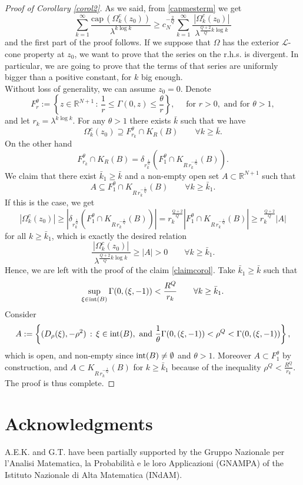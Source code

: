 \documentclass[10pt]{amsart}
\def \RNu {\mathbb{R}^{N+1}}
\def \l {\lambda}
\def\elle{\mathcal{L}}
\numberwithin{equation}{section}
\begin{document}
\begin{proof}[Proof of Corollary \ref{corol2}]
As we said, from \eqref{capmesterm} we get
$$\sum_{k=1}^{\infty}{\frac{\mathrm{cap\, } (\Omega^c_k(z_0))}{\l^{k\log{k}}}}\geq c_N^{-\frac{2}{Q}} \sum_{k=1}^{\infty}{\frac{|\Omega^c_k(z_0)|}{\,\,\l^{\frac{Q+2}{Q}k\log{k}}\,\,}}$$
and the first part of the proof follows. If we suppose that $\Omega$ has the exterior $\elle$-cone property at $z_0$, we want to prove that the series on the r.h.s. is divergent. In particular, we are going to prove that the terms of that series are uniformly bigger than a positive constant, for $k$ big enough.\\
Without loss of generality, we can assume $z_0=0$. Denote
$$F_r^{\theta}:=\left\{z\in\RNu\,:\, \frac{1}{r}\leq \Gamma(0,z)\leq\frac{\theta}{r}\right\},\quad\mbox{ for }r>0, \mbox{ and for }\theta>1,$$
and let $r_k=\lambda^{k\log{k}}$. For any $\theta>1$ there exists $\bar{k}$ such that we have
$$\Omega^c_k(z_0)\supseteq F_{r_k}^{\theta}\cap K_R(B)\qquad\forall k\geq\bar{k}.$$
On the other hand $$F_{r_k}^{\theta}\cap K_R(B)=\delta_{r_k^{\frac{1}{Q}}}\left(F_1^\theta\cap K_{R\,r_k^{-\frac{1}{Q}}}(B)\right).$$
We claim that there exist $\bar{k}_1\geq\bar{k}$ and a non-empty open set $A\subset \RNu$ such that 
\begin{equation}\label{claimcorol}
A\subseteq F_1^\theta\cap K_{R\,r_k^{-\frac{1}{Q}}}(B)\qquad \forall k\geq\bar{k}_1.
\end{equation}
If this is the case, we get
$$|\Omega^c_k(z_0)|\geq\left|\delta_{r_k^{\frac{1}{Q}}}\left(F_1^\theta\cap K_{R\,r_k^{-\frac{1}{Q}}}(B)\right)\right|=r_k^{\frac{Q+2}{Q}}|F_1^\theta\cap K_{R\,r_k^{-\frac{1}{Q}}}(B)|\geq r_k^{\frac{Q+2}{Q}}|A|$$
for all $k\geq\bar{k}_1$, which is exactly the desired relation
$$\frac{|\Omega^c_k(z_0)|}{\,\,\l^{\frac{Q+2}{Q}k\log{k}}\,\,}\geq |A|>0 \qquad \forall k\geq\bar{k}_1.$$
Hence, we are left with the proof of the claim \eqref{claimcorol}. Take $\bar{k}_1\geq\bar{k}$ such that
$$\sup_{\xi\in {\rm int}(B)}{\Gamma(0,(\xi,-1))}<\frac{R^Q}{r_k}\qquad\forall k\geq\bar{k}_1.$$
Consider 
$$A:=\left\{(D_\rho(\xi),-\rho^2)\,:\,\xi\in {\rm int}(B),\,\,\mbox{and }\frac{1}{\theta}\Gamma(0,(\xi,-1))<\rho^Q<\Gamma(0,(\xi,-1))\right\},$$
which is open, and non-empty since ${{\rm int}}(B)\neq\emptyset$ and $\theta>1$. Moreover $A\subset F^\theta_1$ by construction, and $A\subset K_{R\,r_k^{-\frac{1}{Q}}}(B)$ for $k\geq\bar{k}_1$ because of the inequality $\rho^Q<\frac{R^Q}{r_k}$. The proof is thus complete.
\end{proof}



\section*{Acknowledgments}

A.E.K. and G.T.  have been partially supported by the Gruppo Nazionale per l'Analisi Matematica, la Probabilit\`a e le
loro Applicazioni (GNAMPA) of the Istituto Nazionale di Alta Matematica (INdAM).





\end{document}
